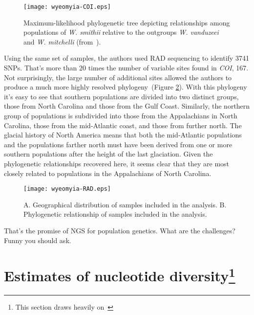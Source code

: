 \documentclass[12pt]{article}
\begin{document}
\begin{figure}
\begin{center}
\texttt{[image: wyeomyia-COI.eps]}
\end{center}
\caption{Maximum-likelihood phylogenetic tree depicting relationships
  among populations of {\it W. smithii\/} relative to the outgroups
  {\it W. vanduzeei\/} and {\it W. mitchelli} (from~\cite{Emerson-etal-2010}).}\label{fig:wyeomyia-COI}
\end{figure}

Using the same set of samples, the authors used RAD sequencing to
identify 3741 SNPs. That's more than 20 times the number of variable
sites found in {\it COI}, 167. Not surprisingly, the large number of
additional sites allowed the authors to produce a much more highly
resolved phylogeny~(Figure \ref{fig:wyeomyia-RAD}). With this
phylogeny it's easy to see that southern populations are divided into
two distinct groups, those from North Carolina and those from the Gulf
Coast. Similarly, the northern group of populations is subdivided into
those from the Appalachians in North Carolina, those from the
mid-Atlantic coast, and those from further north. The glacial history
of North America means that both the mid-Atlantic populations and the
populations farther north must have been derived from one or more
southern populations after the height of the last glaciation. Given
the phylogenetic relationships recovered here, it seems clear that
they are most closely related to populations in the Appalachians of
North Carolina.

\begin{figure}
\begin{center}
\texttt{[image: wyeomyia-RAD.eps]}
\end{center}
\caption{A. Geographical distribution of samples included in the
  analysis. B. Phylogenetic relationship of samples included in the analysis.}\label{fig:wyeomyia-RAD}
\end{figure}

That's the promise of NGS for population genetics. What are the
challenges? Funny you should ask.

\section*{Estimates of nucleotide diversity\footnote{This section draws heavily on~\cite{Lynch-2008}}}
\end{document}
